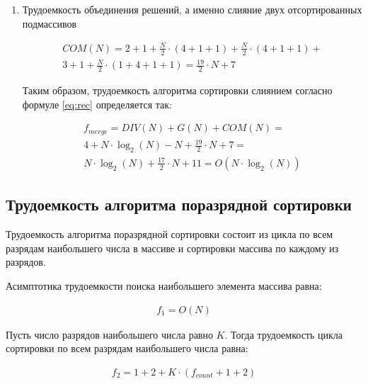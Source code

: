 \begin{enumerate}[label={\arabic*)}]
	\item Трудоемкость объединения решений, а именно слияние двух отсортированных подмассивов
	
	\begin{equation}
		\label{eq:com}
		\begin{gathered}
			COM(N) = 2 + 1 + \frac{N}{2} \cdot (4 + 1 + 1) + \frac{N}{2} \cdot (4 + 1 + 1) + \\
			3 + 1 + \frac{N}{2} \cdot (1 + 4 + 1 + 1) = \frac{19}{2} \cdot N + 7
		\end{gathered}
	\end{equation}

	Таким образом, трудоемкость алгоритма сортировки слиянием согласно формуле \ref{eq:rec} определяется так:
	
	\begin{equation}
		\label{eq:merge}
		\begin{gathered}
			f_{merge} = DIV(N) + G(N) + COM(N) = \\
			4 + N \cdot \log_2(N) - N + \frac{19}{2} \cdot N + 7 = \\
			N \cdot \log_2(N) + \frac{17}{2} \cdot N + 11 = O(N \cdot \log_2(N))
		\end{gathered}
	\end{equation}

\end{enumerate}

\clearpage

\subsection{Трудоемкость алгоритма поразрядной сортировки}

Трудоемкость алгоритма поразрядной сортировки состоит из цикла по всем разрядам наибольшего числа в массиве и сортировки массива по каждому из разрядов.

Асимптотика трудоемкости поиска наибольшего элемента массива равна:

\begin{equation}
	\label{eq:radixPart1}
	\begin{gathered}
		f_1 = O(N)
	\end{gathered}
\end{equation}

Пусть число разрядов наибольшего числа равно $K$. 
Тогда трудоемкость цикла сортировки по всем разрядам наибольшего числа равна:

\begin{equation}
	\label{eq:radixPart2}
	\begin{gathered}
		f_2 = 1 + 2 + K \cdot (f_{count} + 1 + 2)
	\end{gathered}
\end{equation}


